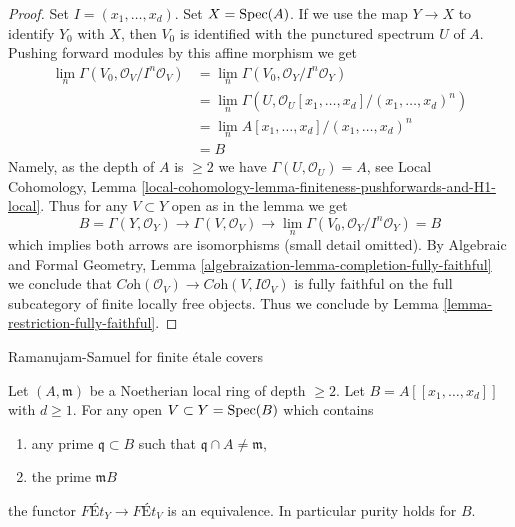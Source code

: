 \begin{proof}
Set $I = (x_1, \ldots, x_d)$. Set $X = \mathop{\mathrm{Spec}}(A)$.
If we use the map $Y \to X$ to identify $Y_0$ with $X$,
then $V_0$ is identified with the punctured spectrum $U$ of $A$.
Pushing forward modules by this affine morphism we get
\begin{align*}
\lim_n \Gamma(V_0, \mathcal{O}_V/I^n\mathcal{O}_V)
& =
\lim_n \Gamma(V_0, \mathcal{O}_Y/I^n\mathcal{O}_Y) \\
& =
\lim_n \Gamma(U, \mathcal{O}_U[x_1, \ldots, x_d]/(x_1, \ldots, x_d)^n) \\
& =
\lim_n A[x_1, \ldots, x_d]/(x_1, \ldots, x_d)^n \\
& =
B
\end{align*}
Namely, as the depth of $A$ is $\geq 2$ we have $\Gamma(U, \mathcal{O}_U) = A$,
see Local Cohomology, Lemma
\ref{local-cohomology-lemma-finiteness-pushforwards-and-H1-local}.
Thus for any $V \subset Y$ open as in the lemma we get
$$
B = \Gamma(Y, \mathcal{O}_Y) \to \Gamma(V, \mathcal{O}_V) \to
\lim_n \Gamma(V_0, \mathcal{O}_Y/I^n\mathcal{O}_Y) = B
$$
which implies both arrows are isomorphisms (small detail omitted).
By Algebraic and Formal Geometry, Lemma 
\ref{algebraization-lemma-completion-fully-faithful}
we conclude that
$\textit{Coh}(\mathcal{O}_V) \to \textit{Coh}(V, I\mathcal{O}_V)$
is fully faithful on the full subcategory of finite locally free objects.
Thus we conclude by
Lemma \ref{lemma-restriction-fully-faithful}.
\end{proof}

\begin{lemma}
\label{lemma-purity-power-series-over-depth2}
\begin{slogan}
Ramanujam-Samuel for finite \'etale covers
\end{slogan}
Let $(A, \mathfrak m)$ be a Noetherian local ring of depth $\geq 2$. Let
$B = A[[x_1, \ldots, x_d]]$ with $d \geq 1$. For any open
$V \subset Y = \mathop{\mathrm{Spec}}(B)$ which contains
\begin{enumerate}
\item any prime $\mathfrak q \subset B$ such that
$\mathfrak q \cap A \not = \mathfrak m$,
\item the prime $\mathfrak m B$
\end{enumerate}
the functor
$
\textit{F\'Et}_Y
\to
\textit{F\'Et}_V
$
is an equivalence. In particular purity holds for $B$.
\end{lemma}

